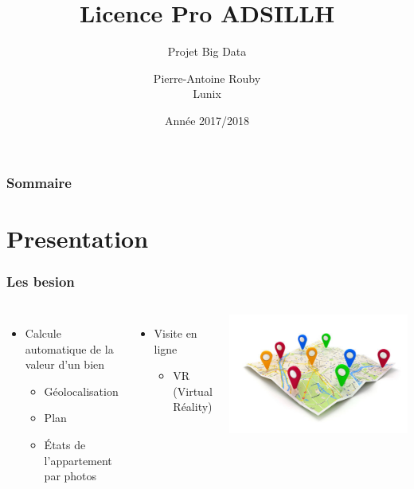 \documentclass{beamer}
\title{Licence Pro ADSILLH}
\subtitle{Projet Big Data}
\author{Pierre-Antoine Rouby\\Lunix}
\date{Année 2017/2018}
\begin{document}
\frame{\titlepage}

\begin{frame}
  \frametitle{Sommaire}
  \tableofcontents
\end{frame}

\section{Presentation}
\begin{frame}
  \frametitle{Les besion}

  \begin{columns}
    \begin{itemize}
    \item Calcule automatique de la valeur d'un bien
      \begin{itemize}
      \item Géolocalisation
      \item Plan
      \item États de l'appartement par photos
      \end{itemize}
    \end{itemize}
    \begin{itemize}
    \item Visite en ligne
      \begin{itemize}
      \item VR (Virtual Réality)
      \end{itemize}
    \end{itemize}
    \includegraphics[scale=1]{../images/geo.jpg}

\end{columns}
\end{frame}
\end{document}
